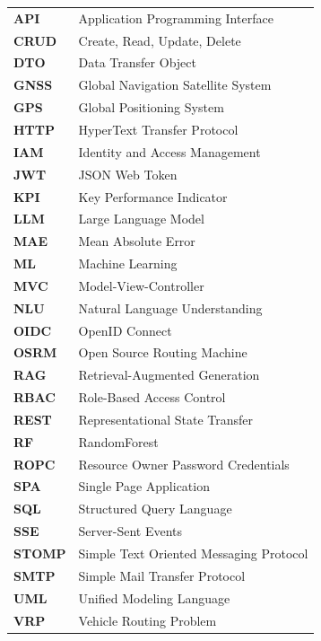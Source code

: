 \documentclass[12pt,a4paper]{report}
\begin{document}
\begin{tabularx}{\textwidth}{lX}
  \textbf{API}     & Application Programming Interface \\
  \textbf{CRUD}    & Create, Read, Update, Delete \\
  \textbf{DTO}     & Data Transfer Object \\
  \textbf{GNSS}    & Global Navigation Satellite System \\
  \textbf{GPS}     & Global Positioning System \\
  \textbf{HTTP}    & HyperText Transfer Protocol \\
  \textbf{IAM}     & Identity and Access Management \\
  \textbf{JWT}     & JSON Web Token \\
  \textbf{KPI}     & Key Performance Indicator \\
  \textbf{LLM}     & Large Language Model \\
  \textbf{MAE}     & Mean Absolute Error \\
  \textbf{ML}      & Machine Learning \\
  \textbf{MVC}     & Model-View-Controller \\
  \textbf{NLU}     & Natural Language Understanding \\
  \textbf{OIDC}    & OpenID Connect \\
  \textbf{OSRM}    & Open Source Routing Machine \\
  \textbf{RAG}     & Retrieval-Augmented Generation \\
  \textbf{RBAC}    & Role-Based Access Control \\
  \textbf{REST}    & Representational State Transfer \\
  \textbf{RF}      & RandomForest \\
  \textbf{ROPC}    & Resource Owner Password Credentials \\
  \textbf{SPA}     & Single Page Application \\
  \textbf{SQL}     & Structured Query Language \\
  \textbf{SSE}     & Server-Sent Events \\
  \textbf{STOMP}   & Simple Text Oriented Messaging Protocol \\
  \textbf{SMTP}    & Simple Mail Transfer Protocol \\
  \textbf{UML}     & Unified Modeling Language \\
  \textbf{VRP}     & Vehicle Routing Problem \\
\end{tabularx}
\end{document}
